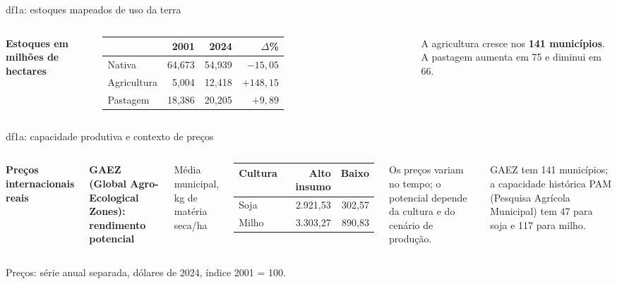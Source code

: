 \documentclass[aspectratio=169,11pt]{beamer}
\newcommand{\fonte}[1]{\par\vfill{\fontsize{7.5}{9}\selectfont\color{gray}#1\par}}
\newcommand{\tpar}{\par\vspace{2mm}}
\begin{document}
\begin{frame}{df1a: estoques mapeados de uso da terra}
\begin{columns}[T,onlytextwidth]

\small
\textbf{Estoques em milhões de hectares}\par\smallskip
\setlength{\tabcolsep}{3pt}
\begin{tabularx}{\linewidth}{L r r r}
\toprule
 & \textbf{2001} & \textbf{2024} & \textbf{$\Delta$\%}\\
\midrule
Nativa & 64,673 & 54,939 & $-15,05$\\
Agricultura & 5,004 & 12,418 & $+148,15$\\
Pastagem & 18,386 & 20,205 & $+9,89$\\
\bottomrule
\end{tabularx}\par
\medskip
A agricultura cresce nos \textbf{141 municípios}. A pastagem aumenta em 75 e diminui em 66.
\end{columns}
\end{frame}

\begin{frame}{df1a: capacidade produtiva e contexto de preços}
\begin{columns}[T,onlytextwidth]
\small\textbf{Preços internacionais reais}\par\smallskip
{\def\LarguraGrafico{.96\linewidth}}
\small
\textbf{GAEZ (Global Agro-Ecological Zones): rendimento potencial}\par
\footnotesize Média municipal, kg de matéria seca/ha\par\smallskip
\small
\begin{tabularx}{\linewidth}{L r r}
\toprule
\textbf{Cultura} & \textbf{Alto insumo} & \textbf{Baixo}\\
\midrule
Soja & 2.921,53 & 302,57\\
Milho & 3.303,27 & 890,83\\
\bottomrule
\end{tabularx}\par
\medskip
Os preços variam no tempo; o potencial depende da cultura e do cenário de produção.
\tpar
GAEZ tem 141 municípios; a capacidade histórica PAM (Pesquisa Agrícola Municipal) tem 47 para soja e 117 para milho.
\end{columns}
\fonte{Preços: série anual separada, dólares de 2024, índice 2001 = 100.}
\end{frame}
\end{document}
